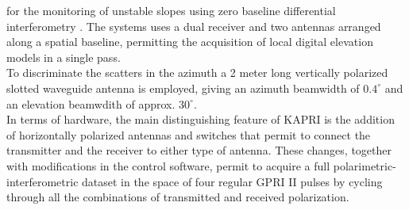 for the monitoring of unstable slopes using zero baseline differential interferometry \cite{Massonnet1993,JGRB:JGRB7093}. The systems uses a dual receiver and two antennas arranged along a spatial baseline, permitting the acquisition of local digital elevation models in a single pass.\\
To discriminate the scatters in the azimuth a 2 meter long vertically polarized slotted waveguide antenna is employed, giving an azimuth beamwidth of $0.4^\circ$ and an elevation beamwdith of approx. $30^\circ$.\\
In terms of hardware, the main distinguishing feature of KAPRI is the addition of horizontally polarized antennas and switches that permit to connect the transmitter and the receiver to either type of antenna. These changes, together with modifications in the control software, permit to acquire a full polarimetric-interferometric dataset in the space of four regular GPRI II pulses by cycling through all the combinations of transmitted and received polarization.
